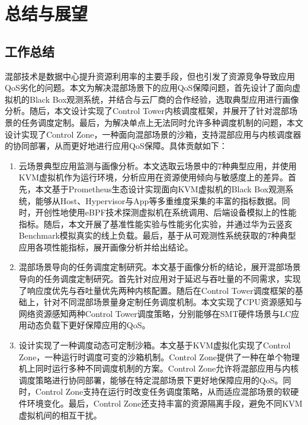 \chapter{总结与展望}\label{chap:theories_tech}

\section{工作总结}

混部技术是数据中心提升资源利用率的主要手段，但也引发了资源竞争导致应用QoS劣化的问题。本文为解决混部场景下的应用QoS保障问题，首先设计了面向虚拟机的Black Box观测系统，并结合与云厂商的合作经验，选取典型应用进行画像分析。随后，本文设计实现了Control Tower内核调度框架，并展开了针对混部场景的任务调度定制。最后，为解决单点上无法同时允许多种调度机制的问题，本文设计实现了Control Zone，一种面向混部场景的沙箱，支持混部应用与内核调度器的协同部署，从而更好地进行应用QoS保障。具体贡献如下：

\begin{enumerate}
    \item 云场景典型应用监测与画像分析。本文选取云场景中的7种典型应用，并使用KVM虚拟机作为运行环境，分析应用在资源使用倾向与敏感度上的差异。首先，本文基于Prometheus生态设计实现面向KVM虚拟机的Black Box观测系统，能够从Host、Hypervisor与App等多重维度采集的丰富的指标数据。同时，开创性地使用eBPF技术探测虚拟机在系统调用、后端设备模拟上的性能指标。随后，本文开展了基准性能实验与性能劣化实验，并通过华为云竖亥Benchmark模拟真实的线上负载。最后，基于从可观测性系统获取的7种典型应用各项性能指标，展开画像分析并给出结论。

    \item 混部场景导向的任务调度定制研究。本文基于画像分析的结论，展开混部场景导向的任务调度定制研究。首先针对应用对于延迟与吞吐量的不同需求，实现了响应度优先与吞吐量优先两种内核配置。随后在Control Tower调度框架的基础上，针对不同混部场景量身定制任务调度机制。本文实现了CPU资源感知与网络资源感知两种Control Tower调度策略，分别能够在SMT硬件场景与LC应用动态负载下更好保障应用的QoS。

    \item 设计实现了一种调度动态可定制沙箱。本文基于KVM虚拟化实现了Control Zone，一种运行时调度可变的沙箱机制。Control Zone提供了一种在单个物理机上同时运行多种不同调度机制的方案。Control Zone允许将混部应用与内核调度策略进行协同部署，能够在特定混部场景下更好地保障应用的QoS。同时，Control Zone支持在运行时改变任务调度策略，从而适应混部场景的软硬件环境变化。最后，Control Zone还支持丰富的资源隔离手段，避免不同KVM虚拟机间的相互干扰。

\end{enumerate}

